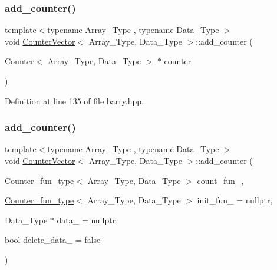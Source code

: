 \mbox{\label{classbarry_1_1_counter_vector_a062d52e18f1d3ba4c00cbf4c2d89f1e7}} 
\subsubsection{\texorpdfstring{add\+\_\+counter()}{add\_counter()}\hspace{0.1cm}{\footnotesize\ttfamily [2/3]}}
{\footnotesize\ttfamily template$<$typename Array\+\_\+\+Type , typename Data\+\_\+\+Type $>$ \\
void \hyperlink{classbarry_1_1_counter_vector}{Counter\+Vector}$<$ Array\+\_\+\+Type, Data\+\_\+\+Type $>$\+::add\+\_\+counter (\begin{DoxyParamCaption}\item[{\hyperlink{classbarry_1_1_counter}{Counter}$<$ Array\+\_\+\+Type, Data\+\_\+\+Type $>$ $\ast$}]{counter }\end{DoxyParamCaption})\hspace{0.3cm}{\ttfamily [inline]}}



Definition at line 135 of file barry.\+hpp.

\mbox{\label{classbarry_1_1_counter_vector_adb32ff1af45bc05a292a5cb064dc414d}} 
\subsubsection{\texorpdfstring{add\+\_\+counter()}{add\_counter()}\hspace{0.1cm}{\footnotesize\ttfamily [3/3]}}
{\footnotesize\ttfamily template$<$typename Array\+\_\+\+Type , typename Data\+\_\+\+Type $>$ \\
void \hyperlink{classbarry_1_1_counter_vector}{Counter\+Vector}$<$ Array\+\_\+\+Type, Data\+\_\+\+Type $>$\+::add\+\_\+counter (\begin{DoxyParamCaption}\item[{\hyperlink{namespacebarry_abaaae3200da8e4b7faac3c04fe9c3081}{Counter\+\_\+fun\+\_\+type}$<$ Array\+\_\+\+Type, Data\+\_\+\+Type $>$}]{count\+\_\+fun\+\_\+,  }\item[{\hyperlink{namespacebarry_abaaae3200da8e4b7faac3c04fe9c3081}{Counter\+\_\+fun\+\_\+type}$<$ Array\+\_\+\+Type, Data\+\_\+\+Type $>$}]{init\+\_\+fun\+\_\+ = {\ttfamily nullptr},  }\item[{Data\+\_\+\+Type $\ast$}]{data\+\_\+ = {\ttfamily nullptr},  }\item[{bool}]{delete\+\_\+data\+\_\+ = {\ttfamily false} }\end{DoxyParamCaption})}



